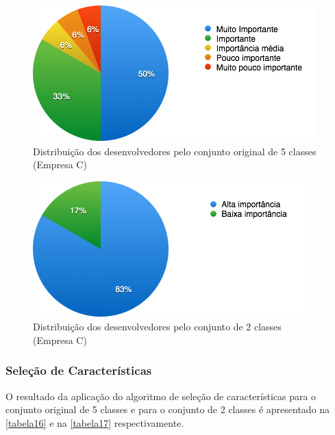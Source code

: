 \begin{figure}[h]
	\centering
	\includegraphics[scale=0.8]{figs/empresa_c/imagem-classe-original.png}
	\caption{\label{fig_15}Distribuição dos desenvolvedores pelo conjunto original de 5 classes (Empresa C)}
\end{figure}

\begin{figure}[h]
	\centering
	\includegraphics[scale=0.8]{figs/empresa_c/imagem-classe-alternativa.png}
	\caption{\label{fig_16}Distribuição dos desenvolvedores pelo conjunto de 2 classes (Empresa C)}
\end{figure}

\subsubsection{Seleção de Características}
O resultado da aplicação do algoritmo de seleção de características para o conjunto original de 5 classes e para o conjunto de 2 classes é apresentado na \autoref{tabela16} e na \autoref{tabela17} respectivamente.

